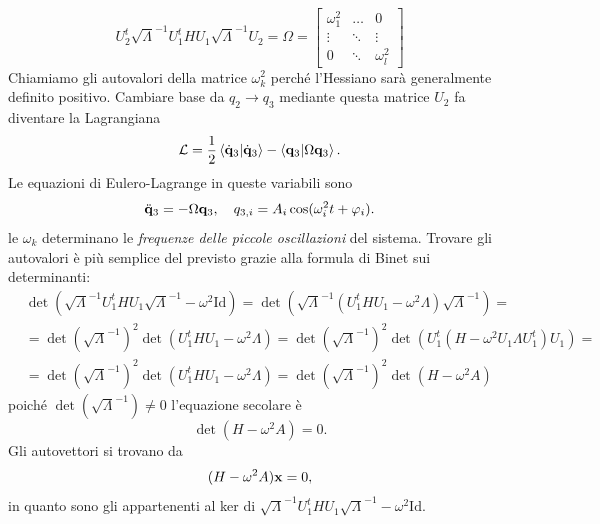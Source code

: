     \begin{equation}
        U_2^t\sqrt{\Lambda}^{-1}U_1^tHU_1\sqrt{\Lambda}^{-1}U_2 = \Omega = \begin{bmatrix}
            \omega_1^2 & \dots &0\\
            \vdots & \ddots & \vdots\\
            0 & \ddots & \omega_l^2
        \end{bmatrix}
    \end{equation}
    Chiamiamo gli autovalori della matrice $\omega^2_k$ perché l'Hessiano sarà generalmente definito positivo. Cambiare base da $q_2\to q_3$ mediante questa matrice $U_2$ fa diventare la Lagrangiana
    \begin{equation}
        \mathcal{L} = \frac{1}{2}\braket{\dot{\mathbf{q}}_3|\dot{\mathbf{q}}_3} - \braket{\mathbf{q}_3|\Omega \mathbf{q}_3}.
    \end{equation}
    Le equazioni di Eulero-Lagrange in queste variabili sono
    \begin{equation}
        \ddot{\mathbf{q}}_3 = -\Omega\mathbf{q}_3,\quad q_{3,i} = A_i\cos(\omega^2_it+\varphi_i).
    \end{equation}
    le $\omega_k$ determinano le \emph{frequenze delle piccole oscillazioni} del sistema. Trovare gli autovalori è più semplice del previsto grazie alla formula di Binet sui determinanti:
    \begin{equation}
        \begin{aligned}
            &\det(\sqrt{\Lambda}^{-1}U_1^tHU_1\sqrt{\Lambda}^{-1}-\omega^2\mathrm{Id}) = \det(\sqrt{\Lambda}^{-1}(U_1^tHU_1-\omega^2\Lambda)\sqrt{\Lambda}^{-1})=\\
            &=\det(\sqrt{\Lambda}^{-1})^2\det(U_1^tHU_1-\omega^2\Lambda)=\det(\sqrt{\Lambda}^{-1})^2\det(U_1^t(H-\omega^2U_1\Lambda U_1^t)U_1)=\\
            &=\det(\sqrt{\Lambda}^{-1})^2\det(U_1^tHU_1-\omega^2\Lambda)=\det(\sqrt{\Lambda}^{-1})^2\det(H-\omega^2A)
        \end{aligned}
    \end{equation}
    poiché $\det(\sqrt{\Lambda}^{-1})\neq 0$ l'equazione secolare è
    \begin{equation}
        \det(H-\omega^2A)=0.
    \end{equation}
    Gli autovettori si trovano da
    \begin{equation}
        (H-\omega^2A)\mathbf{x} =0,
    \end{equation}
    in quanto sono gli appartenenti al ker di $\sqrt{\Lambda}^{-1}U_1^tHU_1\sqrt{\Lambda}^{-1}-\omega^2\mathrm{Id}$.
    
    
